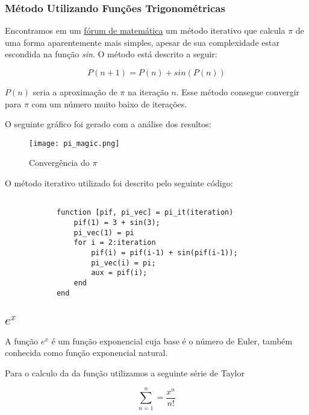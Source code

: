 		\subsubsection{Método Utilizando Funções Trigonométricas}

			Encontramos em um
			\href{http://mathforum.org/library/drmath/view/65244.html}{fórum de
			matemática} um método iterativo que calcula $ \pi $ de uma forma
			aparentemente mais simples, apesar de sua complexidade estar
			escondida na função \emph{sin}. O método está descrito a seguir:

			\begin{equation}
			\label{magic_equation}
				P(n+1) = P(n) + sin(P(n))
			\end{equation}

			$P(n)$ seria a aproximação de $\pi$ na iteração $n$. Esse método
			consegue convergir para $\pi$ com um número muito baixo de
			iterações.

			

			O seguinte gráfico foi gerado com a análise dos resultos:

			\begin{figure}[H]
				\centering
				\texttt{[image: pi\_magic.png]}
				\caption{Convergência do $\pi$}
				\label{fig:pi-magic}
			\end{figure}

			O método iterativo utilizado foi descrito pelo seguinte código:

			\begin{lstlisting}

			function [pif, pi_vec] = pi_it(iteration)
				pif(1) = 3 + sin(3);
				pi_vec(1) = pi
				for i = 2:iteration
					pif(i) = pif(i-1) + sin(pif(i-1));
					pi_vec(i) = pi;
					aux = pif(i);
				end
			end

			\end{lstlisting}

	\subsection{$e^x$}

		A função $e^x$ é um função exponencial cuja base é o número de Euler,
		também conhecida como função exponencial natural.

		Para o calculo da da função utilizamos a seguinte série de Taylor
		
		\begin{equation}
			\sum_{n=1}^{n} = \frac{x^n}{n!}
		\end{equation}


